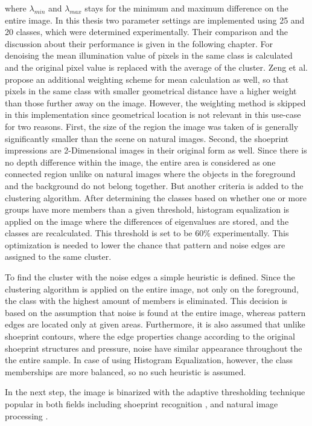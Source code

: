 \documentclass[draft,final]{vutinfth} %
\begin{document}
where $\lambda_{min}$ and $\lambda_{max}$ stays for the minimum and maximum difference on the entire image.
In this thesis two parameter settings are implemented using 25 and 20 classes, which were determined experimentally.
Their comparison and the discussion about their performance is given in the following chapter.
For denoising the mean illumination value of pixels in the same class is calculated and the original pixel value is replaced with the average of the cluster.
Zeng et al. \cite{zeng2011region} propose an additional weighting scheme for mean calculation as well, so that pixels in the same class with smaller geometrical distance have a higher weight than those further away on the image.
However, the weighting method is skipped in this implementation since geometrical location is not relevant in this use-case for two reasons.
First, the size of the region the image was taken of is generally significantly smaller than the scene on natural images.
Second, the shoeprint impressions are 2-Dimensional images in their original form as well. 
Since there is no depth difference within the image, the entire area is considered as one connected region unlike on natural images where the objects in the foreground and the background do not belong together.
But another criteria is added to the clustering algorithm.
After determining the classes based on whether one or more groups have more members than a given threshold, histogram equalization is applied on the image where the differences of eigenvalues are stored, and the classes are recalculated.
This threshold is set to be 60\% experimentally.
This optimization is needed to lower the chance that pattern and noise edges are assigned to the same cluster. 
\par
To find  the cluster with the noise edges a simple heuristic is defined.
Since the clustering algorithm is applied on the entire image, not only on the foreground, the class with the highest amount of members is eliminated.
This decision is based on the assumption that noise is found at the entire image, whereas pattern edges are located only at given areas.
Furthermore, it is also assumed that unlike shoeprint contours, where the edge properties change according to the original shoeprint structures and pressure, noise have similar appearance throughout the the entire sample.
In case of using Histogram Equalization, however, the class memberships are more balanced, so no such heuristic is assumed.
\par
In the next step, the image is binarized with the adaptive thresholding technique \cite{laine1996multiscale} popular in both fields including shoeprint recognition  \cite{wang2014automatic}, \cite{li2014retrieval} and natural image processing \cite{xu2016image}.
\end{document}

